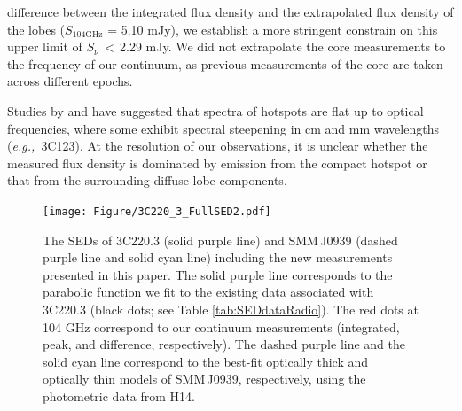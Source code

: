 \documentclass[twocolumn,apj,numberedappendix]{emulateapj}
\newcommand{\eg}{{\sl e.g.,~}}
\begin{document}
difference between the integrated flux density and the extrapolated flux density of the lobes ($S_\textrm{104GHz}$ = 5.10 mJy), we establish a more stringent constrain on this upper limit of $S_\nu$\,$<$\,2.29 mJy. We did not 
 extrapolate the core measurements to the frequency of our continuum, as previous measurements of the core are 
 taken 
 across different epochs. 
\par
Studies by \citet{Meisenheimer89a} and \citet{Hardcastle08a} have suggested that spectra of hotspots are flat up to optical frequencies, where some exhibit spectral steepening in cm and mm wavelengths (\eg 3C123). At the resolution of our observations, it is unclear whether the measured flux density is dominated by emission from the compact hotspot or that from the surrounding diffuse lobe components.

\begin{figure}[!tbph]
\centering
\texttt{[image: Figure/3C220\_3\_FullSED2.pdf]}
\caption{The SEDs of 3C220.3 (solid purple line) and SMM\,J0939 (dashed purple line and solid cyan line) including the new measurements presented in this paper.
The solid purple line corresponds to the parabolic function we
fit to the existing data associated with 3C220.3 (black dots; see Table \ref{tab:SEDdataRadio}).
The red dots at 104 GHz correspond to
our continuum measurements (integrated, peak, and difference, respectively).
The dashed purple line and
the solid cyan line correspond to the best-fit optically thick and optically thin models of SMM\,J0939, respectively, using the photometric data from H14. \label{fig:SED}}
\end{figure}
\end{document}
